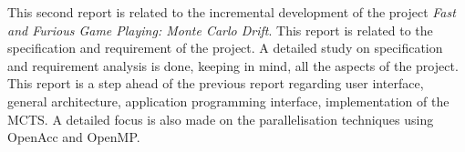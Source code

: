 This second report is related to the incremental development of the project \textit{Fast and Furious Game Playing: Monte Carlo Drift}. This report is related to the specification and requirement of the project.
A detailed study on specification and requirement analysis is done, keeping in mind, all the aspects of the project. This report is a step ahead of the previous report regarding user interface, general architecture, application programming interface, implementation of the MCTS. A detailed focus is also made on the parallelisation techniques using OpenAcc and OpenMP.